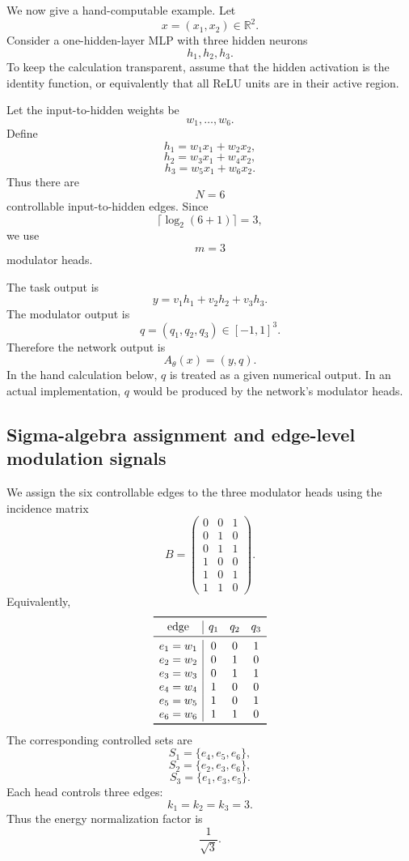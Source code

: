 \documentclass[11pt]{article}
\newcommand{\R}{\mathbb{R}}
\newcommand{\1}{\mathbf{1}}
\begin{document}
We now give a hand-computable example. Let
\[
x=(x_1,x_2)\in\R^2.
\]
Consider a one-hidden-layer MLP with three hidden neurons
\[
h_1,h_2,h_3.
\]
To keep the calculation transparent, assume that the hidden activation is the identity function, or equivalently that all ReLU units are in their active region.

Let the input-to-hidden weights be
\[
w_1,\dots,w_6.
\]
Define
\[
h_1=w_1x_1+w_2x_2,
\]
\[
h_2=w_3x_1+w_4x_2,
\]
\[
h_3=w_5x_1+w_6x_2.
\]
Thus there are
\[
N=6
\]
controllable input-to-hidden edges. Since
\[
\lceil \log_2(6+1)\rceil=3,
\]
we use
\[
m=3
\]
modulator heads.

The task output is
\[
y=v_1h_1+v_2h_2+v_3h_3.
\]
The modulator output is
\[
q=(q_1,q_2,q_3)\in[-1,1]^3.
\]
Therefore the network output is
\[
A_\theta(x)=(y,q).
\]
In the hand calculation below, \(q\) is treated as a given numerical output. In an actual implementation, \(q\) would be produced by the network's modulator heads.

\subsection{Sigma-algebra assignment and edge-level modulation signals}

We assign the six controllable edges to the three modulator heads using the incidence matrix
\[
B=
\begin{pmatrix}
0&0&1\\
0&1&0\\
0&1&1\\
1&0&0\\
1&0&1\\
1&1&0
\end{pmatrix}.
\]
Equivalently,
\[
\begin{array}{c|ccc}
\toprule
\text{edge} & q_1 & q_2 & q_3\\
\midrule
e_1=w_1 & 0 & 0 & 1\\
e_2=w_2 & 0 & 1 & 0\\
e_3=w_3 & 0 & 1 & 1\\
e_4=w_4 & 1 & 0 & 0\\
e_5=w_5 & 1 & 0 & 1\\
e_6=w_6 & 1 & 1 & 0\\
\bottomrule
\end{array}
\]
The corresponding controlled sets are
\[
S_1=\{e_4,e_5,e_6\},
\]
\[
S_2=\{e_2,e_3,e_6\},
\]
\[
S_3=\{e_1,e_3,e_5\}.
\]
Each head controls three edges:
\[
k_1=k_2=k_3=3.
\]
Thus the energy normalization factor is
\[
\frac{1}{\sqrt{3}}.
\]
\end{document}
